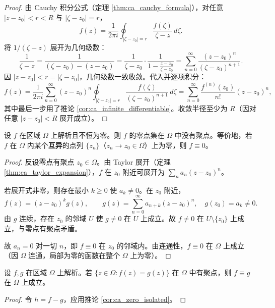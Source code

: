 \begin{proof}
由 Cauchy 积分公式（定理 \ref{thm:ca_cauchy_formula}），对任意 $|z - z_0| < r < R$ 与 $|\zeta - z_0| = r$，
\[
f(z) = \frac{1}{2\pi i} \oint_{|\zeta - z_0| = r} \frac{f(\zeta)}{\zeta - z} \, d\zeta.
\]
将 $1/(\zeta - z)$ 展开为几何级数：
\[
\frac{1}{\zeta - z} = \frac{1}{(\zeta - z_0) - (z - z_0)} = \frac{1}{\zeta - z_0} \cdot \frac{1}{1 - \frac{z - z_0}{\zeta - z_0}} = \sum_{n=0}^{\infty} \frac{(z - z_0)^n}{(\zeta - z_0)^{n+1}}.
\]
因 $|z - z_0| < r = |\zeta - z_0|$，几何级数一致收敛。代入并逐项积分：
\[
f(z) = \frac{1}{2\pi i} \sum_{n=0}^{\infty} (z - z_0)^n \oint_{|\zeta - z_0| = r} \frac{f(\zeta)}{(\zeta - z_0)^{n+1}} \, d\zeta = \sum_{n=0}^{\infty} \frac{f^{(n)}(z_0)}{n!} (z - z_0)^n,
\]
其中最后一步用了推论 \ref{cor:ca_infinite_differentiable}。收敛半径至少为 $R$（因对任意 $|z - z_0| < R$ 展开成立）。
\end{proof}

\begin{corollary}[解析函数的零点孤立性]\label{cor:ca_zero_isolated}
设 $f$ 在区域 $\Omega$ 上解析且不恒为零。则 $f$ 的零点集在 $\Omega$ 中没有聚点。等价地，若 $f$ 在 $\Omega$ 内某个\textbf{互异}的点列 $\{z_n\}$（$z_n \to z_0 \in \Omega$）上为零，则 $f \equiv 0$。
\end{corollary}

\begin{proof}
反设零点有聚点 $z_0 \in \Omega$。由 Taylor 展开（定理 \ref{thm:ca_taylor_expansion}），$f$ 在 $z_0$ 附近可展开为 $\sum_n a_n (z - z_0)^n$。

若展开式非零，则存在最小 $k \ge 0$ 使 $a_k \neq 0$。在 $z_0$ 附近，
\[
f(z) = (z - z_0)^k g(z), \qquad g(z) = \sum_{n=0}^{\infty} a_{n+k} (z - z_0)^n, \quad g(z_0) = a_k \neq 0.
\]
由 $g$ 连续，存在 $z_0$ 的邻域 $U$ 使 $g \neq 0$ 在 $U$ 上成立。故 $f \neq 0$ 在 $U \setminus \{z_0\}$ 上成立，与零点有聚点矛盾。

故 $a_n = 0$ 对一切 $n$，即 $f \equiv 0$ 在 $z_0$ 的邻域内。由连通性，$f \equiv 0$ 在 $\Omega$ 上成立（因 $\Omega$ 连通，局部为零的函数在整个 $\Omega$ 上为零）。
\end{proof}

\begin{corollary}[解析函数的唯一性定理]\label{cor:ca_identity_theorem}
设 $f, g$ 在区域 $\Omega$ 上解析。若 $\{z \in \Omega : f(z) = g(z)\}$ 在 $\Omega$ 中有聚点，则 $f \equiv g$ 在 $\Omega$ 上成立。
\end{corollary}

\begin{proof}
令 $h = f - g$，应用推论 \ref{cor:ca_zero_isolated}。
\end{proof}

